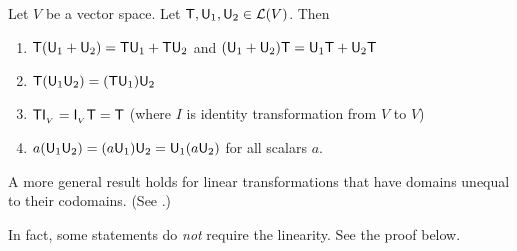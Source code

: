 \begin{theorem} \label{thm 2.10}
Let \(V\) be a vector space. Let \(\textsf{T}, \textsf{U}_1, \textsf{U}_2 \in \mathcal{L}(V)\).
Then
\begin{enumerate}
\item \(\textsf{T}(\textsf{U}_1 + \textsf{U}_2) = \textsf{T}\textsf{U}_1 + \textsf{T}\textsf{U}_2\) and \((\textsf{U}_1 + \textsf{U}_2)\textsf{T} = \textsf{U}_1\textsf{T} + \textsf{U}_2\textsf{T}\)
\item \(\textsf{T}(\textsf{U}_1 \textsf{U}_2) = (\textsf{T}\textsf{U}_1)\textsf{U}_2\)
\item \(\textsf{T} \textsf{I}_{_V} = \textsf{I}_{_V} \textsf{T} = \textsf{T}\) (where \(I\) is identity transformation from \(V\) to \(V\))
\item \(a(\textsf{U}_1\textsf{U}_2) = (a\textsf{U}_1)\textsf{U}_2 = \textsf{U}_1(a\textsf{U}_2)\) for all scalars \(a\).
\end{enumerate}
\sloppy A more general result holds for linear transformations that have domains unequal to their codomains. (See .)
\end{theorem}

\begin{note}
In fact, some statements do \emph{not} require the linearity.
See the proof below.
\end{note}

